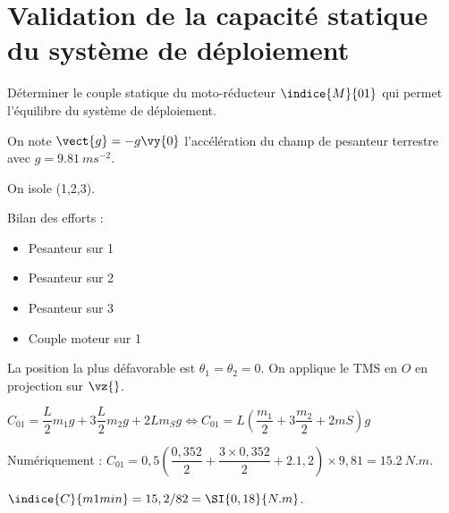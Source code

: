 \section{Validation de la capacité statique du système de déploiement}

\begin{obj}
Déterminer le couple statique du moto-réducteur $\indice{M}{01}$ qui permet l’équilibre du système de déploiement.
\end{obj}

On note $\vect{g} = - g \vy{0}$ l'accélération du champ de pesanteur terrestre avec $g = \SI{9,81}{ms^{-2}}$.

\ifprof
\begin{corrige}%
On isole (1,2,3).

Bilan des efforts : 
\begin{itemize}
\item Pesanteur sur  1 
\item Pesanteur sur 2
\item Pesanteur sur 3
\item Couple moteur sur 1
\end{itemize}

La position la plus défavorable est $\theta_1=\theta_2=0$.
On applique le TMS en $O$ en projection sur $\vz{}$.

$C_{01}=\dfrac{L}{2} m_1g+3\dfrac{L}{2} m_2g+2Lm_Sg \Leftrightarrow C_{01}=L\left(\dfrac{m_1}{2}+3\dfrac{m_2}{2}+2mS\right)g$

Numériquement :
$C_{01}=0,5\left(\dfrac{0,352}{2}+\dfrac{3\times 0,352}{2}+2.1,2\right) \times 9,81=\SI{15,2}{N.m}$.

\end{corrige}
\else
\fi


\ifprof
\begin{corrige}%
$\indice{C}{m1 min}= 15,2/82 = \SI{0,18}{N.m}$.
\end{corrige}
\else
\fi
